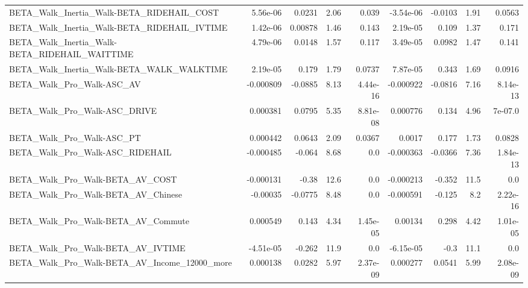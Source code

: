 \begin{tabular}{lrrrrrrrr}
BETA\_Walk\_Inertia\_Walk-BETA\_RIDEHAIL\_COST          &    5.56e-06 &       0.0231 &     2.06 &    0.039 &  -3.54e-06 &     -0.0103 &         1.91 &        0.0563 \\
BETA\_Walk\_Inertia\_Walk-BETA\_RIDEHAIL\_IVTIME        &    1.42e-06 &      0.00878 &     1.46 &    0.143 &   2.19e-05 &       0.109 &         1.37 &         0.171 \\
BETA\_Walk\_Inertia\_Walk-BETA\_RIDEHAIL\_WAITTIME      &    4.79e-06 &       0.0148 &     1.57 &    0.117 &   3.49e-05 &      0.0982 &         1.47 &         0.141 \\
BETA\_Walk\_Inertia\_Walk-BETA\_WALK\_WALKTIME          &    2.19e-05 &        0.179 &     1.79 &   0.0737 &   7.87e-05 &       0.343 &         1.69 &        0.0916 \\
BETA\_Walk\_Pro\_Walk-ASC\_AV                          &   -0.000809 &      -0.0885 &     8.13 & 4.44e-16 &  -0.000922 &     -0.0816 &         7.16 &      8.14e-13 \\
BETA\_Walk\_Pro\_Walk-ASC\_DRIVE                       &    0.000381 &       0.0795 &     5.35 & 8.81e-08 &   0.000776 &       0.134 &         4.96 &       7e-07.0 \\
BETA\_Walk\_Pro\_Walk-ASC\_PT                          &    0.000442 &       0.0643 &     2.09 &   0.0367 &     0.0017 &       0.177 &         1.73 &        0.0828 \\
BETA\_Walk\_Pro\_Walk-ASC\_RIDEHAIL                    &   -0.000485 &       -0.064 &     8.68 &      0.0 &  -0.000363 &     -0.0366 &         7.36 &      1.84e-13 \\
BETA\_Walk\_Pro\_Walk-BETA\_AV\_COST                    &   -0.000131 &        -0.38 &     12.6 &      0.0 &  -0.000213 &      -0.352 &         11.5 &           0.0 \\
BETA\_Walk\_Pro\_Walk-BETA\_AV\_Chinese                 &    -0.00035 &      -0.0775 &     8.48 &      0.0 &  -0.000591 &      -0.125 &          8.2 &      2.22e-16 \\
BETA\_Walk\_Pro\_Walk-BETA\_AV\_Commute                 &    0.000549 &        0.143 &     4.34 & 1.45e-05 &    0.00134 &       0.298 &         4.42 &      1.01e-05 \\
BETA\_Walk\_Pro\_Walk-BETA\_AV\_IVTIME                  &   -4.51e-05 &       -0.262 &     11.9 &      0.0 &  -6.15e-05 &        -0.3 &         11.1 &           0.0 \\
BETA\_Walk\_Pro\_Walk-BETA\_AV\_Income\_12000\_more       &    0.000138 &       0.0282 &     5.97 & 2.37e-09 &   0.000277 &      0.0541 &         5.99 &      2.08e-09 \\

\end{tabular}
